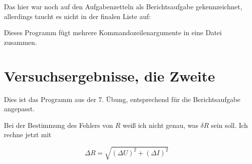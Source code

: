 Das hier war noch auf den Aufgabenzetteln als Berichtsaufgabe gekennzeichnet, allerdings taucht es nicht in der finalen Liste auf:

Dieses Programm fügt mehrere Kommandozeilenargumente in eine Datei zusammen.


\section{Versuchsergebnisse, die Zweite}

Dies ist das Programm aus der 7. Übung, entsprechend für die Berichtsaufgabe angepasst.

Bei der Bestimmung des Fehlers von $R$ weiß ich nicht genau, was $\delta R$ sein soll. Ich rechne jetzt mit

\begin{equation}
\Delta R = \sqrt{(\Delta U)^2 + (\Delta I)^2}
\end{equation}

